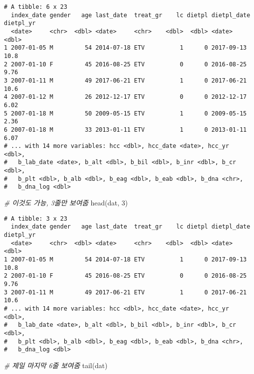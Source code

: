 \documentclass[
]{article}
\newenvironment{Shaded}{\begin{snugshade}}{\end{snugshade}}
\newcommand{\CommentTok}[1]{\textcolor[rgb]{0.56,0.35,0.01}{\textit{#1}}}
\newcommand{\DecValTok}[1]{\textcolor[rgb]{0.00,0.00,0.81}{#1}}
\newcommand{\FunctionTok}[1]{\textcolor[rgb]{0.00,0.00,0.00}{#1}}
\newcommand{\NormalTok}[1]{#1}
\begin{document}
\begin{verbatim}
# A tibble: 6 x 23
  index_date gender   age last_date  treat_gr    lc dietpl dietpl_date dietpl_yr
  <date>     <chr>  <dbl> <date>     <chr>    <dbl>  <dbl> <date>          <dbl>
1 2007-01-05 M         54 2014-07-18 ETV          1      0 2017-09-13      10.8 
2 2007-01-10 F         45 2016-08-25 ETV          0      0 2016-08-25       9.76
3 2007-01-11 M         49 2017-06-21 ETV          1      0 2017-06-21      10.6 
4 2007-01-12 M         26 2012-12-17 ETV          0      0 2012-12-17       6.02
5 2007-01-18 M         50 2009-05-15 ETV          1      0 2009-05-15       2.36
6 2007-01-18 M         33 2013-01-11 ETV          1      0 2013-01-11       6.07
# ... with 14 more variables: hcc <dbl>, hcc_date <date>, hcc_yr <dbl>,
#   b_lab_date <date>, b_alt <dbl>, b_bil <dbl>, b_inr <dbl>, b_cr <dbl>,
#   b_plt <dbl>, b_alb <dbl>, b_eag <dbl>, b_eab <dbl>, b_dna <chr>,
#   b_dna_log <dbl>
\end{verbatim}

\begin{Shaded}
\begin{Highlighting}[]
\CommentTok{\# 이것도 가능, 3줄만 보여줌}
\FunctionTok{head}\NormalTok{(dat, }\DecValTok{3}\NormalTok{)}
\end{Highlighting}
\end{Shaded}

\begin{verbatim}
# A tibble: 3 x 23
  index_date gender   age last_date  treat_gr    lc dietpl dietpl_date dietpl_yr
  <date>     <chr>  <dbl> <date>     <chr>    <dbl>  <dbl> <date>          <dbl>
1 2007-01-05 M         54 2014-07-18 ETV          1      0 2017-09-13      10.8 
2 2007-01-10 F         45 2016-08-25 ETV          0      0 2016-08-25       9.76
3 2007-01-11 M         49 2017-06-21 ETV          1      0 2017-06-21      10.6 
# ... with 14 more variables: hcc <dbl>, hcc_date <date>, hcc_yr <dbl>,
#   b_lab_date <date>, b_alt <dbl>, b_bil <dbl>, b_inr <dbl>, b_cr <dbl>,
#   b_plt <dbl>, b_alb <dbl>, b_eag <dbl>, b_eab <dbl>, b_dna <chr>,
#   b_dna_log <dbl>
\end{verbatim}

\begin{Shaded}
\begin{Highlighting}[]
\CommentTok{\# 제일 마지막 6줄 보여줌}
\FunctionTok{tail}\NormalTok{(dat)}
\end{Highlighting}
\end{Shaded}
\end{document}

